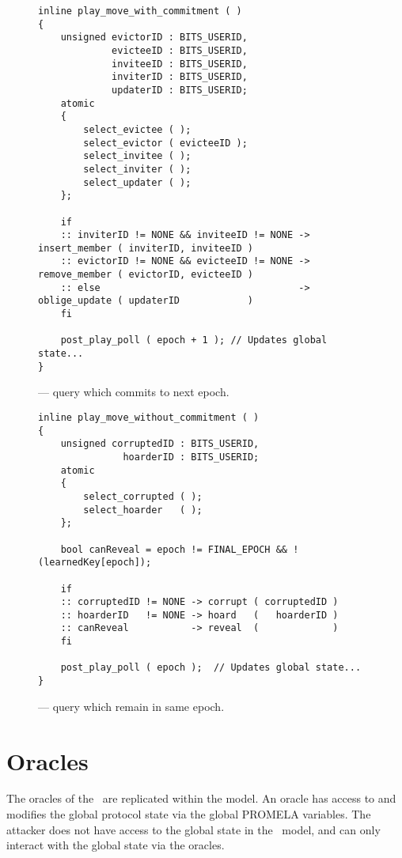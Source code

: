 \begin{figure}[ht!]
  \centering
  \caption{\label{fig:Control-Commitment}\CGKAmod{}{}{} --- query which commits to next epoch.}
\begin{verbatim}
inline play_move_with_commitment ( )
{
    unsigned evictorID : BITS_USERID, 
             evicteeID : BITS_USERID, 
             inviteeID : BITS_USERID, 
             inviterID : BITS_USERID,
             updaterID : BITS_USERID;
    atomic
    {
        select_evictee ( );
        select_evictor ( evicteeID );
        select_invitee ( );
        select_inviter ( );
        select_updater ( );
    };

    if
    :: inviterID != NONE && inviteeID != NONE -> insert_member ( inviterID, inviteeID )
    :: evictorID != NONE && evicteeID != NONE -> remove_member ( evictorID, evicteeID )
    :: else                                   -> oblige_update ( updaterID            )
    fi

    post_play_poll ( epoch + 1 ); // Updates global state...
}
\end{verbatim}
\end{figure}

\begin{figure}[ht!]
  \centering
  \caption{\label{fig:Control-Noncommitment}\CGKAmod{}{}{} --- query which remain in same epoch.}
\begin{verbatim}
inline play_move_without_commitment ( )
{
    unsigned corruptedID : BITS_USERID, 
               hoarderID : BITS_USERID;
    atomic
    {
        select_corrupted ( );
        select_hoarder   ( );
    };

    bool canReveal = epoch != FINAL_EPOCH && !(learnedKey[epoch]);

    if
    :: corruptedID != NONE -> corrupt ( corruptedID )
    :: hoarderID   != NONE -> hoard   (   hoarderID )
    :: canReveal           -> reveal  (             )
    fi

    post_play_poll ( epoch );  // Updates global state...
}
\end{verbatim}
\end{figure}


\hypertarget{sec:game-oracles}{%
\section{Oracles}\label{sec:game-oracles}}

The oracles of the \CGKAsec\ are replicated within the  model.
An oracle has access to and modifies the global protocol state via the global PROMELA variables.
The attacker does not have access to the global state in the \CGKAmod\ model, and can only interact with the global state via the oracles.


